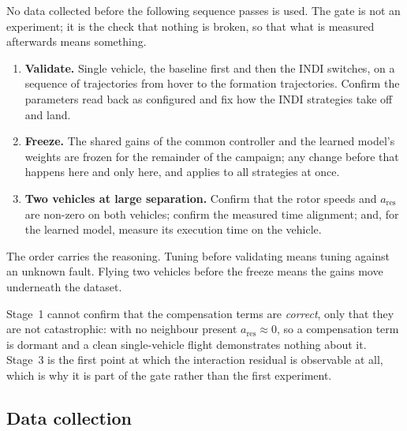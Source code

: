 No data collected before the following sequence passes is used. The gate is not an experiment; it
is the check that nothing is broken, so that what is measured afterwards means something.

\begin{enumerate}
  \item \textbf{Validate.} Single vehicle, the baseline first and then the INDI switches, on a
        sequence of trajectories from hover to the formation trajectories. Confirm the parameters
        read back as configured and fix how the INDI strategies take off and land.
  \item \textbf{Freeze.} The shared gains of the common controller and the learned model's
        weights are frozen for the remainder of the campaign; any change before that happens here
        and only here, and applies to all strategies at once.
  \item \textbf{Two vehicles at large separation.} Confirm that the rotor speeds and
        $a_{\mathrm{res}}$ are non-zero on both vehicles; confirm the measured time alignment; and,
        for the learned model, measure its execution time on the vehicle.
\end{enumerate}

The order carries the reasoning. Tuning before validating means tuning against an unknown fault.
Flying two vehicles before the freeze means the gains move underneath the dataset.

Stage~1 cannot confirm that the compensation terms are \emph{correct}, only that they are not
catastrophic: with no neighbour present $a_{\mathrm{res}} \approx 0$, so a compensation term is
dormant and a clean single-vehicle flight demonstrates nothing about it. Stage~3 is the first point
at which the interaction residual is observable at all, which is why it is part of the gate rather
than the first experiment.

\subsection{Data collection}
\label{sec:setup-collect}

